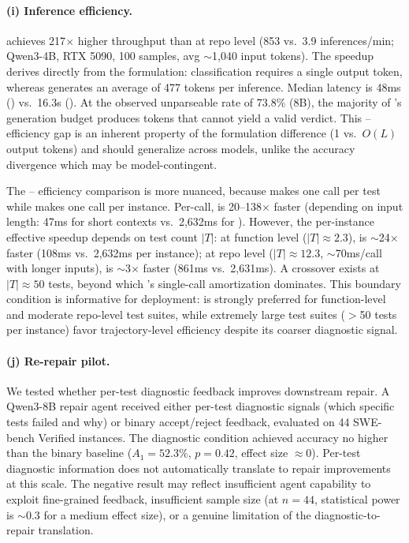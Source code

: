 \paragraph{(i) Inference efficiency.}
\cls{} achieves 217$\times$ higher throughput than \cwm{} at repo level (853 vs.\ 3.9 inferences/min; Qwen3-4B, RTX 5090, 100 samples, avg ${\sim}$1,040 input tokens). The speedup derives directly from the formulation: classification requires a single output token, whereas \cwm{} generates an average of 477 tokens per inference. Median latency is 48ms (\cls{}) vs.\ 16.3s (\cwm{}). At the observed unparseable rate of 73.8\% (8B), the majority of \cwm{}'s generation budget produces tokens that cannot yield a valid verdict. This \cls{}--\cwm{} efficiency gap is an inherent property of the formulation difference (1 vs.\ $O(L)$ output tokens) and should generalize across models, unlike the accuracy divergence which may be model-contingent.

The \cls{}--\traj{} efficiency comparison is more nuanced, because \cls{} makes one call per test while \traj{} makes one call per instance. Per-call, \cls{} is 20--138$\times$ faster (depending on input length: 47ms for short contexts vs.\ 2,632ms for \traj{}). However, the per-instance effective speedup depends on test count $|T|$: at function level ($|T| \approx 2.3$), \cls{} is ${\sim}$24$\times$ faster (108ms vs.\ 2,632ms per instance); at repo level ($|T| \approx 12.3$, ${\sim}$70ms/call with longer inputs), \cls{} is ${\sim}$3$\times$ faster (861ms vs.\ 2,631ms). A crossover exists at $|T| \approx 50$ tests, beyond which \traj{}'s single-call amortization dominates. This boundary condition is informative for deployment: \cls{} is strongly preferred for function-level and moderate repo-level test suites, while extremely large test suites ($>$50 tests per instance) favor trajectory-level efficiency despite its coarser diagnostic signal.

\paragraph{(j) Re-repair pilot.}
We tested whether per-test diagnostic feedback improves downstream repair. A Qwen3-8B repair agent received either per-test diagnostic signals (which specific tests failed and why) or binary accept/reject feedback, evaluated on 44 SWE-bench Verified instances. The diagnostic condition achieved accuracy no higher than the binary baseline ($A_1 = 52.3\%$, $p = 0.42$, effect size $\approx 0$). Per-test diagnostic information does not automatically translate to repair improvements at this scale. The negative result may reflect insufficient agent capability to exploit fine-grained feedback, insufficient sample size (at $n = 44$, statistical power is ${\sim}$0.3 for a medium effect size), or a genuine limitation of the diagnostic-to-repair translation.


